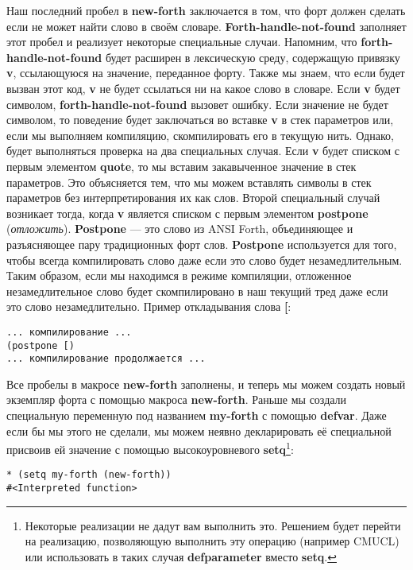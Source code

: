 Наш последний пробел в \textbf{new-forth} заключается в том, что форт должен сделать если не может найти слово в своём словаре. \textbf{Forth-handle-not-found} заполняет этот пробел и реализует некоторые специальные случаи. Напомним, что \textbf{forth-handle-not-found} будет расширен в лексическую среду, содержащую привязку \textbf{v}, ссылающуюся на значение, переданное форту. Также мы знаем, что если будет вызван этот код, \textbf{v} не будет ссылаться ни на какое слово в словаре. Если \textbf{v} будет символом, \textbf{forth-handle-not-found} вызовет ошибку. Если значение не будет символом, то поведение будет заключаться во вставке \textbf{v} в стек параметров или, если мы выполняем компиляцию, скомпилировать его в текущую нить. Однако, будет выполняться проверка на два специальных случая. Если \textbf{v} будет списком с первым элементом \textbf{quote}, то мы вставим закавыченное значение в стек параметров. Это объясняется тем, что мы можем вставлять символы в стек параметров без интерпретирования их как слов. Второй специальный случай возникает тогда, когда \textbf{v} является списком с первым элементом \textbf{postpone} (\emph{отложить}). \textbf{Postpone} --- это слово из ANSI Forth, объединяющее и разъясняющее пару традиционных форт слов. \textbf{Postpone} используется для того, чтобы всегда компилировать слово даже если это слово будет незамедлительным. Таким образом, если мы находимся в режиме компиляции, отложенное незамедлительное слово будет скомпилировано в наш текущий тред даже если это слово незамедлительно. Пример откладывания слова \textbf{[}:

\begin{verbatim}
... компилирование ...
(postpone [)
... компилирование продолжается ...
\end{verbatim}

Все пробелы в макросе \textbf{new-forth} заполнены, и теперь мы можем создать новый экземпляр форта с помощью макроса \textbf{new-forth}. Раньше мы создали специальную переменную под названием \textbf{my-forth} с помощью \textbf{defvar}. Даже если бы мы этого не сделали, мы можем неявно декларировать её специальной присвоив ей значение с помощью высокоуровневого \textbf{setq}\footnote{Некоторые реализации не дадут вам выполнить это. Решением будет перейти на реализацию, позволяющую выполнить эту операцию (например CMUCL) или использовать в таких случая \textbf{defparameter} вместо \textbf{setq}.}:

\begin{verbatim}
* (setq my-forth (new-forth))
#<Interpreted function>
\end{verbatim}

